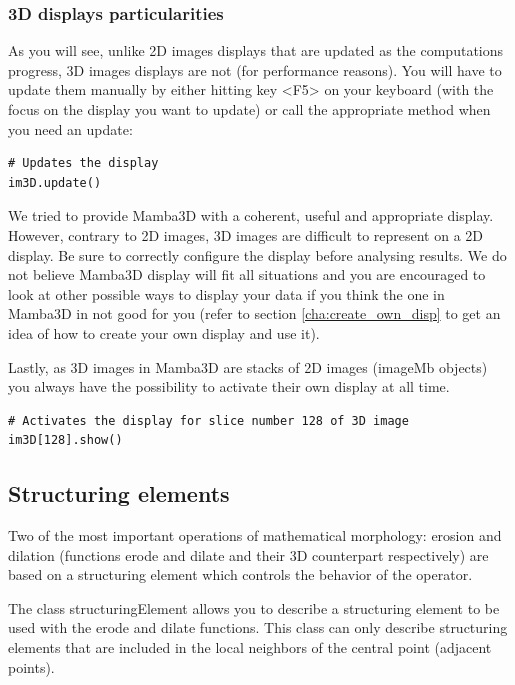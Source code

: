 \documentclass[a4paper,10pt,oneside]{article}
\begin{document}
\subsubsection{3D displays particularities}
As you will see, unlike 2D images displays that are updated as the computations
progress, 3D images displays are not (for performance reasons). You will have
to update them manually by either hitting key <F5> on your keyboard (with
the focus on the display you want to update) or call the appropriate method
when you need an update:

\lstset{language=Python}
\begin{lstlisting}
# Updates the display
im3D.update()
\end{lstlisting}

We tried to provide Mamba3D with a coherent, useful and appropriate display.
However, contrary to 2D images, 3D images are difficult to represent on a 2D
display. Be sure to correctly configure the display before analysing results.
We do not believe Mamba3D display will fit all situations and you are
encouraged to look at other possible ways to display your data if you
think the one in Mamba3D in not good for you (refer to section \ref{cha:create_own_disp}
to get an idea of how to create your own display and use it).

Lastly, as 3D images in Mamba3D are stacks of 2D images (imageMb objects) you 
always have the possibility to activate their own display at all time.

\lstset{language=Python}
\begin{lstlisting}
# Activates the display for slice number 128 of 3D image
im3D[128].show()
\end{lstlisting}

\subsection{Structuring elements}

Two of the most important operations of mathematical morphology: erosion and
dilation (functions erode and dilate and their 3D counterpart respectively)
are based on a structuring element which controls the behavior of the operator.

The class structuringElement allows you to describe a structuring element to
be used with the erode and dilate functions. This class can only describe
structuring elements that are included in the local 
neighbors of the central point (adjacent points).
\end{document}

